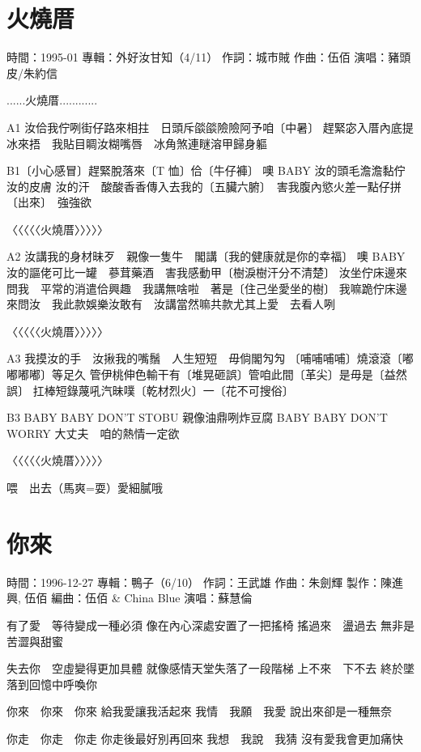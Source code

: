 \documentclass[UTF8,a4paper,oneside,twocolumn,12pt]{ctexbook}
\newcommand{\infopair}[2]{\textbullet #1：#2}
\newcommand{\zc}[1][伍佰]{\infopair{作詞}{#1}}
\newcommand{\zq}[1][伍佰]{\infopair{作曲}{#1}}
\newcommand{\bq}[1][伍佰]{\infopair{編曲}{#1}}
\newcommand{\zj}[1]{\infopair{專輯}{#1}}
\newcommand{\zz}[1]{\infopair{製作}{#1}}
\newcommand{\sj}[1]{\infopair{時間}{#1}}
\newenvironment{info}{\begin{flushleft}\kaishu
	}
	{\end{flushleft}\normalsize\yahei\par}
\newenvironment{lyric}{
	}
{}
\begin{document}
\section{火燒厝}
\begin{info}
	\sj{1995-01}
	\zj{外好汝甘知（4/11）}
	\zc[城市賊]
	\zq[伍佰]
	\infopair{演唱}{豬頭皮/朱約信}
\end{info}
\begin{lyric}
	......火燒厝............

	A1 汝佮我佇咧街仔路來相拄　日頭斥燄燄險險阿予咱〔中暑〕
	趕緊宓入厝內底提冰來捂　我貼目睭汝糊嘴唇　冰角煞連瞇溶甲歸身軀

	B1〔小心感冒〕趕緊脫落來〔T 恤〕佮〔牛仔褲〕
	噢 BABY 汝的頭毛澹澹黏佇汝的皮膚
	汝的汗　酸酸香香傳入去我的〔五臟六腑〕　害我腹內慾火差一點仔拼〔出來〕　強強欲

	〈〈〈〈〈火燒厝〉〉〉〉〉

	A2 汝講我的身材昧歹　親像一隻牛　閣講〔我的健康就是你的幸福〕
	噢 BABY 汝的謳佬可比一罐　蔘茸藥酒　害我感動甲〔樹淚樹汗分不清楚〕
	汝坐佇床邊來問我　平常的消遣佮興趣　我講無啥啦　著是〔住己坐愛坐的樹〕
	我嘛跪佇床邊來問汝　我此款娛樂汝敢有　汝講當然嘛共款尤其上愛　去看人咧

	〈〈〈〈〈火燒厝〉〉〉〉〉

	A3 我摸汝的手　汝揪我的嘴鬚　人生短短　毋倘閣勼勼
	〔哺哺哺哺〕燒滾滾〔嘟嘟嘟嘟〕等足久
	管伊桃伸色輸干有〔堆晃砸誤〕管咱此間〔革尖〕是毋是〔益然誤〕
	扛棒短錄蔑吼汽昧噗〔乾材烈火〕一〔花不可搜俗〕

	B3 BABY BABY DON'T STOBU 親像油鼎咧炸豆腐
	BABY BABY DON'T WORRY 大丈夫　咱的熱情一定欲

	〈〈〈〈〈火燒厝〉〉〉〉〉

	喂　出去（馬爽=耍）愛細膩哦
\end{lyric}

\section{你來}
\begin{info}
	\sj{1996-12-27}
	\zj{鴨子（6/10）}
	\zc[王武雄]
	\zq[朱劍輝]
	\zz{陳進興, 伍佰}
	\bq[伍佰 \& China Blue]
	\infopair{演唱}{蘇慧倫}
\end{info}
\begin{lyric}
	有了愛　等待變成一種必須
	像在內心深處安置了一把搖椅
	搖過來　盪過去
	無非是苦澀與甜蜜

	失去你　空虛變得更加具體
	就像感情天堂失落了一段階梯
	上不來　下不去
	終於墜落到回憶中呼喚你

	你來　你來　你來
	給我愛讓我活起來
	我情　我願　我愛
	說出來卻是一種無奈

	你走　你走　你走
	你走後最好別再回來
	我想　我說　我猜
	沒有愛我會更加痛快
\end{lyric}
\end{document}
